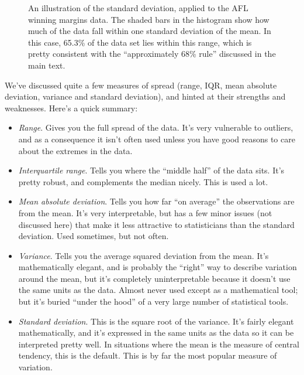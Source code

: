 \begin{figure}[h]
\begin{center}
\caption{An illustration of the standard deviation, applied to the AFL winning margins data. The shaded bars in the histogram show how much of the data fall within one standard deviation of the mean. In this case, 65.3\% of the data set lies within this range, which is pretty consistent with the ``approximately 68\% rule'' discussed in the main text.}
\label{fig:aflsd}
\HR
\end{center}
\end{figure}


We've discussed quite a few measures of spread (range, IQR, mean absolute deviation, variance and standard deviation), and hinted at their strengths and weaknesses. Here's a quick summary:

\begin{itemize}
\item {\it Range}. Gives you the full spread of the data. It's very vulnerable to outliers, and as a consequence it isn't often used unless you have good reasons to care about the extremes in the data.
\item {\it Interquartile range}. Tells you where the ``middle half'' of the data sits. It's pretty robust, and complements the median nicely. This is used a lot.
\item {\it Mean absolute deviation}. Tells you how far ``on average'' the observations are from the mean. It's very interpretable, but has a few minor issues (not discussed here) that make it less attractive to statisticians than the standard deviation. Used sometimes, but not often.
\item {\it Variance}. Tells you the average squared deviation from the mean. It's mathematically elegant, and is probably the ``right'' way to describe variation around the mean, but it's completely uninterpretable because it doesn't use the same units as the data. Almost never used except as a mathematical tool; but it's buried ``under the hood'' of a very large number of statistical tools.
\item {\it Standard deviation}. This is the square root of the variance. It's fairly elegant mathematically, and it's expressed in the same units as the data so it can be interpreted pretty well. In situations where the mean is the measure of central tendency, this is the default. This is by far the most popular measure of variation. 
\end{itemize}

